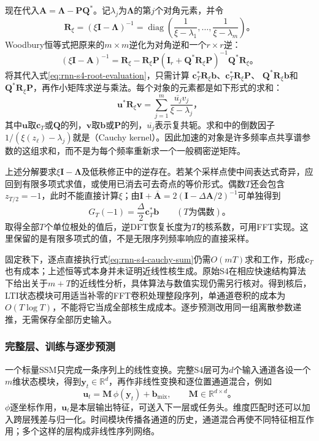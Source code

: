 现在代入$\bm A=\bm\Lambda-\bm P\bm Q^*$。记$\lambda_j$为$\bm\Lambda$的第$j$个对角元素，并令
\[
  \bm R_\xi=(\xi\bm I-\bm\Lambda)^{-1}
    =\operatorname{diag}\!\left(
       \frac1{\xi-\lambda_1},\ldots,\frac1{\xi-\lambda_m}\right)\text{。}
\]
Woodbury恒等式把原来的$m\times m$逆化为对角逆和一个$r\times r$逆：
\begin{equation}
  (\xi\bm I-\bm A)^{-1}
    =\bm R_\xi-\bm R_\xi\bm P
       (\bm I_r+\bm Q^*\bm R_\xi\bm P)^{-1}
       \bm Q^*\bm R_\xi\text{。}
  \label{eq:rnn-s4-woodbury}
\end{equation}
将其代入式\eqref{eq:rnn-s4-root-evaluation}，只需计算
$\bm c_T^*\bm R_\xi\bm b$、$\bm c_T^*\bm R_\xi\bm P$、
$\bm Q^*\bm R_\xi\bm b$和$\bm Q^*\bm R_\xi\bm P$，再作小矩阵求逆与乘法。每个对象的元素都是如下形式的求和：
\begin{equation}
  \bm u^*\bm R_\xi\bm v
    =\sum_{j=1}^{m}\frac{\overline{u_j}v_j}{\xi-\lambda_j}\text{，}
  \label{eq:rnn-s4-cauchy-sum}
\end{equation}
其中$\bm u$取$\bm c_T$或$\bm Q$的列，$\bm v$取$\bm b$或$\bm P$的列，$\overline{u_j}$表示复共轭。求和中的倒数因子$1/(\xi(z_\ell)-\lambda_j)$就是（Cauchy kernel）。因此加速的对象是许多频率点共享谱参数的这组求和，而不是为每个频率重新求一个一般稠密逆矩阵。

上述分解要求$\xi\bm I-\bm\Lambda$及低秩修正中的逆存在。若某个采样点使中间表达式奇异，应回到有限多项式求值，或使用已消去可去奇点的等价形式。偶数$T$还会包含$z_{T/2}=-1$，此时不能直接计算$\xi$；由$\bm I+\overline{\bm A}=2(\bm I-\Delta\bm A/2)^{-1}$可单独得到
\[
  G_T(-1)=\frac{\Delta}{2}\bm c_T^*\bm b
  \qquad(T\text{为偶数})\text{。}
\]
取得全部$T$个单位根处的值后，逆DFT恢复长度为$T$的核系数，可用FFT实现。这里保留的是有限多项式的值，不是无限序列频率响应的直接采样。

固定秩下，逐点直接执行式\eqref{eq:rnn-s4-cauchy-sum}仍需$O(mT)$求和工作，形成$\bm c_T$也有成本；上述恒等式本身并未证明近线性核生成。原始S4在相应快速结构算法下给出关于$m+T$的近线性分析，具体算法与数值实现仍需另行核对。得到核后，LTI状态模块可用适当补零的FFT卷积处理整段序列，单通道卷积的成本为$O(T\log T)$，不能将它当成全部核生成成本。逐步预测改用同一组离散参数递推，无需保存全部历史输入。

\subsubsection{完整层、训练与逐步预测}
\label{sec:rnn-s4-architecture}

一个标量SSM只完成一条序列上的线性变换。完整S4层可为$d$个输入通道各设一个$m$维状态模块，得到$\bm y_t\in\mathbb R^d$，再作非线性变换和逐位置通道混合，例如
\begin{equation}
  \bm u_t=\bm M\,\phi(\bm y_t)+\bm b_{\mathrm{mix}},
  \qquad\bm M\in\mathbb R^{d\times d}\text{。}
  \label{eq:rnn-s4-channel-layer}
\end{equation}
$\phi$逐坐标作用，$\bm u_t$是本层输出特征，可送入下一层或任务头。维度匹配时还可以加入跨层残差与归一化。时间模块传播各通道的历史，通道混合再使不同特征相互作用；多个这样的层构成非线性序列网络。

